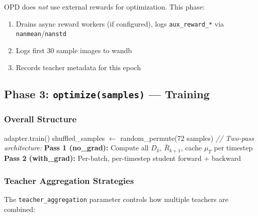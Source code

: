 \documentclass[11pt]{article}
\begin{document}
OPD does \emph{not} use external rewards for optimization. This phase:
\begin{enumerate}[nosep]
    \item Drains async reward workers (if configured), logs \texttt{aux\_reward\_*} via \texttt{nanmean}/\texttt{nanstd}
    \item Logs first 30 sample images to wandb
    \item Records teacher metadata for this epoch
\end{enumerate}

\subsection{Phase 3: \texttt{optimize(samples)} --- Training}

\subsubsection{Overall Structure}

\begin{algorithm}[H]
\caption{OPD optimize() --- high-level}
\begin{algorithmic}
\STATE adapter.train()
    \STATE shuffled\_samples $\leftarrow$ random\_permute(72 samples)
    \STATE \textit{// Two-pass architecture:}
    \STATE \textbf{Pass 1 (no\_grad):} Compute all $D_k$, $\bar{R}_{k+1}$, cache $\mu_T$ per timestep
    \STATE \textbf{Pass 2 (with\_grad):} Per-batch, per-timestep student forward + backward
\ENDFOR
\end{algorithmic}
\end{algorithm}

\subsubsection{Teacher Aggregation Strategies}

The \texttt{teacher\_aggregation} parameter controls how multiple teachers are combined:
\end{document}
